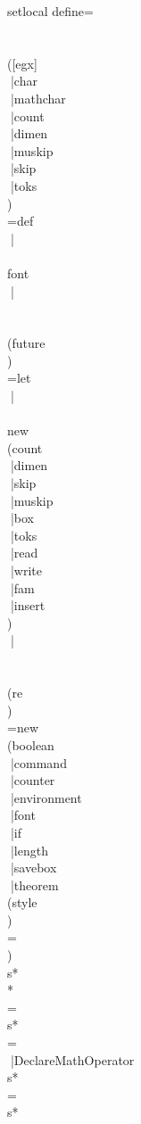 {{setlocal define=\\\\\\([egx]\\|char\\|mathchar\\|count\\|dimen\\|muskip\\|skip\\|toks\\)\\=def\\|\\\\font\\|\\\\\\(future\\)\\=let\\|\\\\new\\(count\\|dimen\\|skip\\|muskip\\|box\\|toks\\|read\\|write\\|fam\\|insert\\)\\|\\\\\\(re\\)\\=new\\(boolean\\|command\\|counter\\|environment\\|font\\|if\\|length\\|savebox\\|theorem\\(style\\)\\=\\)\\s*\\*\\=\\s*{\\=\\|DeclareMathOperator\\s*{\\=\\s*
}}}}
